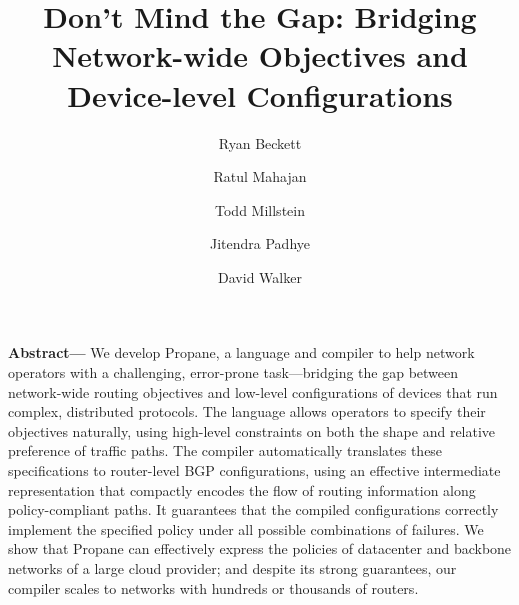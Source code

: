 \documentclass[10pt]{sigalternate052015}
\newcommand{\sysname}{{\small \sf Propane}\xspace}
\begin{document}




\title{Don't Mind the Gap:  Bridging Network-wide Objectives and Device-level Configurations}



\author{%
Ryan Beckett\\
\and
Ratul Mahajan\\
\and
Todd Millstein\\
\and
Jitendra Padhye\\
\and
David Walker\\
}

\maketitle



\textbf{Abstract---}
We develop \sysname, a language and compiler to help network operators with a challenging, error-prone task---bridging the gap between network-wide routing objectives and low-level configurations of devices that run complex, distributed protocols.
%
The language allows operators to specify their objectives naturally, using
high-level constraints on both the shape and relative preference of traffic paths.
%
The compiler automatically translates these specifications to router-level BGP configurations, using an effective intermediate representation that compactly encodes the flow of routing information along policy-compliant paths.
It guarantees that the compiled configurations correctly implement the specified policy under all possible combinations of failures.
%
We show that \sysname can effectively express the policies of datacenter and backbone networks of a large cloud provider;  and despite its strong guarantees, our compiler scales to networks with hundreds or thousands of routers.
\end{document}
